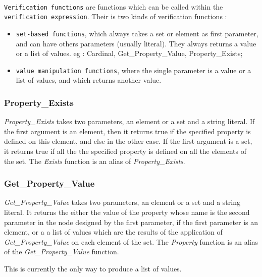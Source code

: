 \label{check_function}

\paragraph{}

\texttt{Verification functions} are functions which can be called 
within the \texttt{verification expression}. Their is two kinds of 
verification functions :
\begin {itemize}
\item \texttt{set-based functions}, which always takes a set or
element as first parameter, and can have others parameters 
(usually literal). They always returns a value or a list of values. 
eg : Cardinal, Get\_Property\_Value, Property\_Exists;
\item \texttt{value manipulation functions}, where the single 
parameter is a value or a list of values, and which returns another 
value.
\end {itemize}

\subsubsection {Property\_Exists}

\textit {Property\_Exists} takes two parameters, an element
or a set and a string literal. If the first argument is an 
element, then it returns true if the specified property is 
defined on this element, and else in the other case.
If the first argument is a set, it returns true if all the
the specified property is defined on all the elements of the 
set. The \textit{Exists} function is an alias of \textit 
{Property\_Exists}.
 
\subsubsection {Get\_Property\_Value}

\textit {Get\_Property\_Value} takes two parameters, an element
or a set and a string literal. It returns the either the value 
of the property whose name is the second parameter in the node 
designed by the first parameter, if the first parameter is an
element, or a a list of values which are the results of the 
application of \textit {Get\_Property\_Value} on each element
of the set. The \textit {Property} function is an alias of the
\textit {Get\_Property\_Value} function.

This is currently the only way to produce a list of values.

